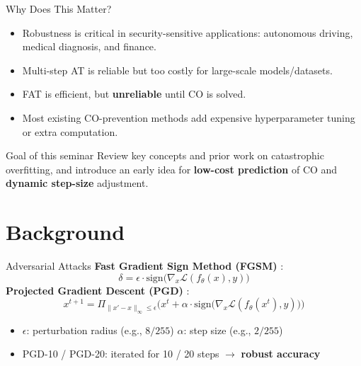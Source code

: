 \documentclass[11pt,aspectratio=169]{beamer}
\begin{document}
\begin{frame}{Why Does This Matter?}
  \begin{itemize}
    \item Robustness is critical in security-sensitive applications: autonomous driving, medical diagnosis, and finance.
    \item Multi-step AT is reliable but too costly for large-scale models/datasets.
    \item FAT is efficient, but \textbf{unreliable} until CO is solved.
    \item Most existing CO-prevention methods add expensive hyperparameter tuning or extra computation. %
  \end{itemize}
  \vskip 0.3cm
  \begin{block}{Goal of this seminar}
    Review key concepts and prior work on catastrophic overfitting, and introduce an early idea for \textbf{low-cost prediction} of CO and \textbf{dynamic step-size} adjustment.
  \end{block}
\end{frame}

\section{Background}

\begin{frame}{Adversarial Attacks}
  \textbf{Fast Gradient Sign Method (FGSM)} \cite{goodfellow2015explaining}:
  \[
  \delta = \epsilon \cdot \mathrm{sign}\big( \nabla_{x} \mathcal{L}(f_{\theta}(x), y) \big)
  \]
  \vskip 0.2cm
  \textbf{Projected Gradient Descent (PGD)} \cite{madry2018towards}:
  \[
  x^{t+1} = \Pi_{\|x'-x\|_{\infty}\le\epsilon}\Big( x^{t} + \alpha \cdot \mathrm{sign}\big( \nabla_{x} \mathcal{L}(f_{\theta}(x^{t}), y) \big) \Big)
  \]
  \begin{itemize}
    \item $\epsilon$: perturbation radius (e.g., $8/255$) \quad $\alpha$: step size (e.g., $2/255$)
    \item PGD-10 / PGD-20: iterated for 10 / 20 steps $\rightarrow$ \textbf{robust accuracy}
  \end{itemize}
\end{frame}
\end{document}
